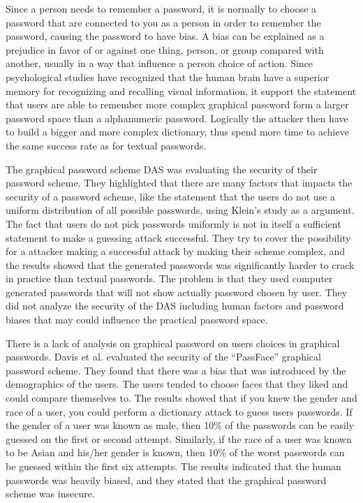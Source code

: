   Since a person needs to remember a password, it is normally to choose a password that are connected to you as a person in order to remember the password, causing the password to have bias. A bias can be explained as a prejudice in favor of or against one thing, person, or group compared with another, usually in a way that influence a person choice of action. Since psychological studies have recognized that the human brain have a superior memory for recognizing and recalling visual information, it support the statement that users are able to remember more complex graphical password form a larger password space than a alphanumeric password. Logically the attacker then have to build a bigger and more complex dictionary, thus spend more time to achieve the same success rate as for textual passwords. 

  The graphical password scheme DAS \cite{Jermyn} was evaluating the security of their password scheme. They highlighted that there are many factors that impacts the security of a password scheme, like the statement that the users do not use a uniform distribution of all possible passwords, using Klein's study \cite{UnixPasswords} as a argument. The fact that users do not pick passwords uniformly is not in itself a sufficient statement to make a guessing attack successful. They try to cover the possibility for a attacker making a successful attack by making their scheme complex, and the results showed that the generated passwords was significantly harder to crack in practice than textual passwords. The problem is that they used computer generated passwords that will not show actually password chosen by user. They did not analyze the security of the DAS including human factors and password biases that may could influence the practical password space. 

  There is a lack of analysis on graphical password on users choices in graphical passwords. Davis et al.\cite{Davis} evaluated the security of the ``PassFace'' graphical password scheme. They found that there was a bias that was introduced by the demographics of the users. The users tended to choose faces that they liked and could compare themselves to. The results showed that if you knew the gender and race of a user, you could perform a dictionary attack to guess users passwords. If the gender of a user was known as male, then 10\% of the passwords can be easily guessed on the first or second attempt. Similarly, if the race of a user was known to be Asian and his/her gender is known, then 10\% of the worst passwords can be guessed within the first six attempts. The results indicated that the human passwords was heavily biased, and they stated that the graphical password scheme was insecure. 


